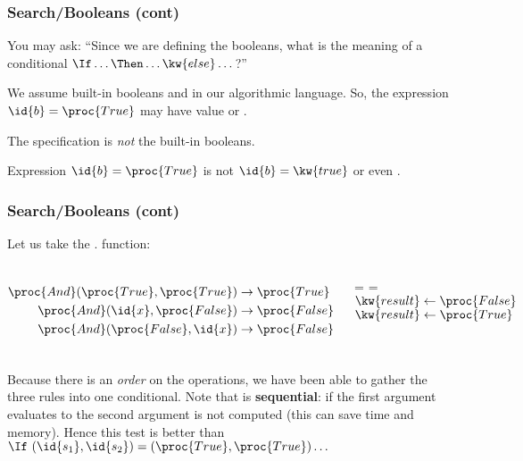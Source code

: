 %
\begin{frame}
\frametitle{Search/Booleans (cont)}

You may ask: ``Since we are defining the booleans, what is the meaning
of a conditional \(\If  \dots \Then \dots \kw{else} \dots\)?''

\bigskip

We assume built-in booleans  and  in our
algorithmic language. So, the expression \(\id{b} = \proc{True}\) may
have value  or .

\bigskip

The  specification is \emph{not} the built-in booleans.

\bigskip

Expression \(\id{b} = \proc{True}\) is not \(\id{b} = \kw{true}\) or
even .

\end{frame}

%
\begin{frame}
\frametitle{Search/Booleans (cont)}

Let us take the . function:

\begin{columns}
    \begin{align*}
      \proc{And} (\proc{True}, \proc{True}) &\rightarrow \proc{True}\\
      \proc{And} (\id{x}, \proc{False}) &\rightarrow \proc{False}\\
      \proc{And} (\proc{False}, \id{x}) &\rightarrow \proc{False}
    \end{align*}
    \begin{codebox}
      \zi	\If {} =    = 
      \zi	\Then \(\kw{result} \gets \proc{False}\)
      \zi	\Else \(\kw{result} \gets \proc{True}\)
      \zi	\End
    \end{codebox}
\end{columns}

\medskip

Because there is an \emph{order} on the operations, we have been able
to gather the three rules into one conditional. Note that  is
\textbf{sequential}: if the first argument evaluates to 
the second argument is not computed (this can save time and
memory). Hence this test is better than \(\If \,\, (\id{s_1},
\id{s_2}) = (\proc{True}, \proc{True}) \dots\)

\end{frame}

